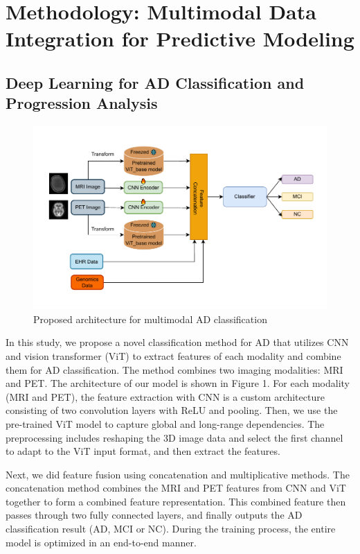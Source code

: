 \section{Methodology: Multimodal Data Integration for Predictive Modeling}
\label{sec:method}

\subsection{Deep Learning for AD Classification and Progression Analysis}
\begin{figure}
    \centering
    \includegraphics[width=1\linewidth]{figs/arch-classification_new.pdf}
    \caption{Proposed architecture for multimodal AD classification}
    \vspace{-2mm}
    \label{fig:enter-label}
\end{figure}

In this study, we propose a novel classification method for AD that utilizes CNN and vision transformer (ViT\cite{dosovitskiy_image_2021}) to extract features of each modality and combine them for AD classification. The method combines two imaging modalities: MRI and PET. The architecture of our model is shown in Figure 1. For each modality (MRI and PET), the feature extraction with CNN is a custom architecture consisting of two convolution layers with ReLU and pooling. Then, we use the pre-trained ViT model to capture global and long-range dependencies. The preprocessing includes reshaping the 3D image data and select the first channel to adapt to the ViT input format, and then extract the features. 

Next, we did feature fusion using concatenation and multiplicative methods. The concatenation method combines the MRI and PET features from CNN and ViT together to form a combined feature representation. This combined feature then passes through two fully connected layers, and finally outputs the AD classification result (AD, MCI or NC). During the training process, the entire model is optimized in an end-to-end manner. 


